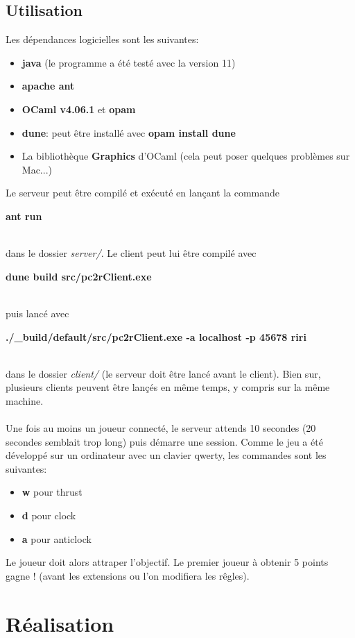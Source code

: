 \documentclass{article}
\begin{document}
\subsection{Utilisation}
Les dépendances logicielles sont les suivantes:
\begin{itemize}
  \item \textbf{java} (le programme a été testé avec la version 11)
  \item \textbf{apache ant}
  \item \textbf{OCaml v4.06.1} et \textbf{opam}
  \item \textbf{dune}: peut être installé avec \textbf{opam install dune}
  \item La bibliothèque \textbf{Graphics} d'OCaml (cela peut poser quelques problèmes sur Mac...)
\end{itemize}
Le serveur peut être compilé et exécuté en lançant la commande\\
\centerline{\textbf{ant run}}\\
dans le dossier \textit{server/}. Le client peut lui être compilé avec\\
\centerline{\textbf{dune build src/pc2rClient.exe}}\\
puis lancé avec\\
\centerline{\textbf{./\_build/default/src/pc2rClient.exe -a localhost -p 45678 riri}}\\
dans le dossier \textit{client/} (le serveur doit être lancé avant le client). Bien sur, plusieurs clients peuvent être lançés en même temps, y compris sur la même machine.\\\\
Une fois au moins un joueur connecté, le serveur attends 10 secondes (20 secondes semblait trop long) puis démarre une session. Comme le jeu a été développé sur un ordinateur avec un clavier qwerty, les commandes sont les suivantes:
\begin{itemize}
\item \textbf{w} pour thrust
\item \textbf{d} pour clock
\item \textbf{a} pour anticlock
\end{itemize}
Le joueur doit alors attraper l'objectif. Le premier joueur à obtenir 5 points gagne ! (avant les extensions ou l'on modifiera les rêgles).

\section{Réalisation}
\end{document}
